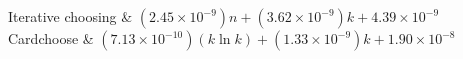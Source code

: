 Iterative choosing & \((2.45 \times 10^{-9})n + (3.62 \times 10^{-9})k + 4.39 \times 10^{-9}\)\\
Cardchoose & \((7.13 \times 10^{-10})(k \ln k) + (1.33 \times 10^{-9})k + 1.90 \times 10^{-8}\)\\
